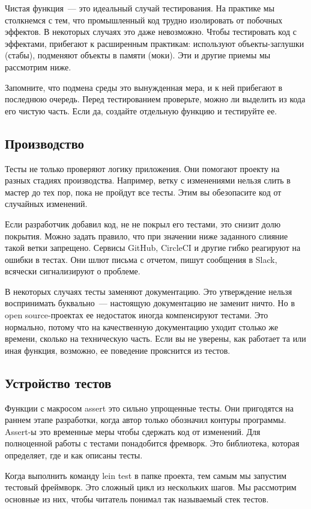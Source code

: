 Чистая функция~--- это идеальный случай тестирования. На практике мы столкнемся с
тем, что промышленный код трудно изолировать от побочных эффектов. В некоторых
случаях это даже невозможно. Чтобы тестировать код с эффектами, прибегают к
расширенным практикам: используют объекты-заглушки (стабы), подменяют объекты в
памяти (моки). Эти и другие приемы мы рассмотрим ниже.

Запомните, что подмена среды это вынужденная мера, и к ней прибегают в последнюю
очередь. Перед тестированием проверьте, можно ли выделить из кода его чистую
часть. Если да, создайте отдельную функцию и тестируйте ее.

\subsection{Производство}

Тесты не только проверяют логику приложения. Они помогают проекту на разных
стадиях производства. Например, ветку с изменениями нельзя слить в мастер до тех
пор, пока не пройдут все тесты. Этим вы обезопасите код от случайных изменений.

Если разработчик добавил код, не не покрыл его тестами, это снизит долю
покрытия. Можно задать правило, что при значении ниже заданного слияние такой
ветки запрещено. Сервисы GitHub, CircleCI и другие гибко реагируют на ошибки в
тестах. Они шлют письма с отчетом, пишут сообщения в Slack, всячески
сигнализируют о проблеме.

В некоторых случаях тесты заменяют документацию. Это утверждение нельзя
воспринимать буквально~--- настоящую документацию не заменит ничто. Но в open
source-проектах ее недостаток иногда компенсируют тестами. Это нормально, потому
что на качественную документацию уходит столько же времени, сколько на
техническую часть. Если вы не уверены, как работает та или иная функция,
возможно, ее поведение прояснится из тестов.

\subsection{Устройство тестов}

Функции с макросом assert это сильно упрощенные тесты. Они пригодятся на раннем
этапе разработки, когда автор только обозначил контуры программы. Assert-ы это
временные меры чтобы сдержать код от изменений. Для полноценной работы с тестами
понадобится фремворк. Это библиотека, которая определяет, где и как описаны
тесты.

Когда выполнить команду lein test в папке проекта, тем самым мы запустим
тестовый фреймворк. Это сложный цикл из нескольких шагов. Мы рассмотрим основные
из них, чтобы читатель понимал так называемый стек тестов.


